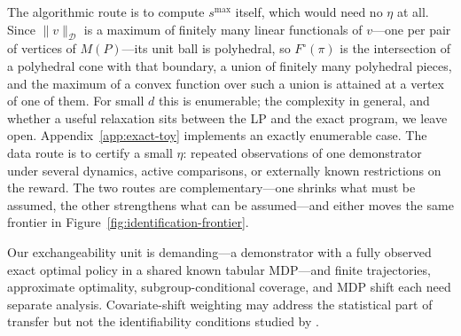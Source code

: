 \documentclass{article}
\newcommand{\Dnorm}[1]{\|#1\|_{\mathcal D}}
\begin{document}
The algorithmic route is to compute $s^{\max}$ itself, which would need no
$\eta$ at all. Since $\Dnorm{v}$ is a maximum of finitely many linear
functionals of $v$---one per pair of vertices of $M(P)$---its unit ball is
polyhedral, so $F^\circ(\pi)$ is the intersection of a polyhedral cone with that
boundary, a union of finitely many polyhedral pieces, and the maximum of a
convex function over such a union is attained at a vertex of one of them. For
small $d$ this is enumerable; the complexity in general, and whether a useful
relaxation sits between the LP and the exact program, we leave open.
Appendix~\ref{app:exact-toy} implements an exactly enumerable case. The data
route is to certify a small $\eta$: repeated observations of one demonstrator
under several dynamics, active comparisons, or externally known restrictions on
the reward. The two routes are complementary---one shrinks what must be
assumed, the other strengthens what can be assumed---and either moves the same
frontier in Figure~\ref{fig:identification-frontier}.

Our exchangeability unit is demanding---a demonstrator with a fully observed
exact optimal policy in a shared known tabular MDP---and finite trajectories,
approximate optimality, subgroup-conditional coverage, and MDP shift each need separate
analysis. Covariate-shift weighting \citep{tibshirani2019conformal} may address
the statistical part of transfer but not the identifiability conditions studied
by \citet{schlaginhaufen2024towards}.
\end{document}
